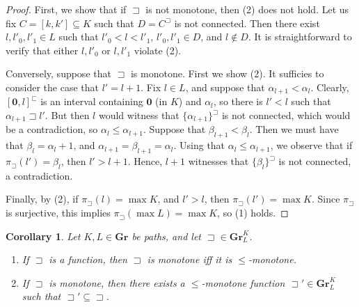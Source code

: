 \documentclass[12pt]{amsart}
\numberwithin{equation}{section}
\theoremstyle{plain}
\newtheorem{corollary}[theorem]{\bf Corollary}
\theoremstyle{definition}
\newcommand \sqsp{\sqsupset}
\newcommand \rt{\mathbf{0}}
\newcommand \GGRb{\mathbf{Gr}}
\begin{document}
\begin{proof}
First, we show that if $\sqsp$ is not monotone, then (2) does not hold. Let us fix $C=[k,k'] \subseteq K$ such that $D= C^\sqsp$ is not connected. Then there exist $l,l'_0,l'_1 \in L$ such that $l'_0<l<l'_1$, $l'_0,l'_1 \in D$, and $l \not \in D$. It is straightforward to verify that either $l, l'_0$ or $l, l'_1$ violate (2). 


Conversely, suppose that $\sqsp$ is monotone.  First we show (2).  It sufficies to consider the case that $l'=l+1$. Fix $l \in L$, and suppose that $\alpha_{l+1}<\alpha_l$. Clearly, $[\rt,l]^\sqsubset$ is an interval containing $\rt$ (in $K$) and $\alpha_l$, so there is $l'<l$ such that $\alpha_{l+1} \sqsp l'$. But then $l$ would  witness that $\{\alpha_{l+1}\}^\sqsp$ is not connected, which would be a contradiction, so $\alpha_{l} \leq \alpha_{l+1}$.  Suppose that $\beta_{l+1}<\beta_l$. Then we must have that $\beta_l=\alpha_l+1$, and $\alpha_{l+1}=\beta_{l+1}=\alpha_l$. Using that $\alpha_{l} \leq \alpha_{l+1}$, we observe that if $\pi_\sqsp(l')=\beta_l$, then $l'>l+1$. Hence, $l+1$ witnesses that $\{\beta_l\}^\sqsp$ is not connected, a contradiction.

Finally, by (2), if $\pi_\sqsp(l)=\max K$, and $l'>l$, then $\pi_\sqsp(l')=\max K$. Since $\pi_\sqsp$ is surjective, this implies $\pi_\sqsp(\max L)=\max K$, so (1) holds.
\end{proof}


\begin{corollary}
\label{co:CharCMon}
Let $K, L \in \GGRb$ be paths, and let $\sqsp \in \GGRb^K_L$.
\begin{enumerate}
	\item If $\sqsp$ is  a function, then $\sqsp$ is monotone iff it is $\leq$-monotone.
	\item  If $\sqsp$ is monotone, then there exists a $\leq$-monotone function $\sqsp' \in \GGRb^K_L$ such that $\sqsp' \subseteq \sqsp$.
\end{enumerate}
\end{corollary} 
\end{document}
